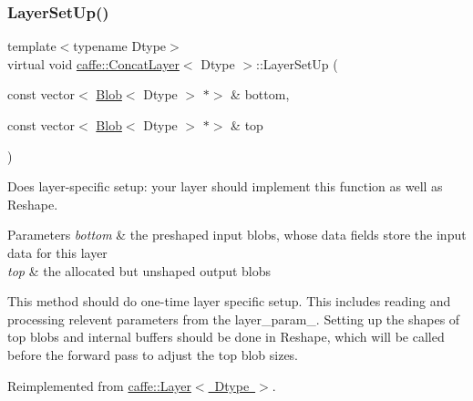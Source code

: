 \mbox{\label{classcaffe_1_1_concat_layer_aa39bdc6829d06c8cc501554ecd166513}} 
\subsubsection{\texorpdfstring{Layer\+Set\+Up()}{LayerSetUp()}\hspace{0.1cm}{\footnotesize\ttfamily [2/2]}}
{\footnotesize\ttfamily template$<$typename Dtype$>$ \\
virtual void \mbox{\hyperlink{classcaffe_1_1_concat_layer}{caffe\+::\+Concat\+Layer}}$<$ Dtype $>$\+::Layer\+Set\+Up (\begin{DoxyParamCaption}\item[{const vector$<$ \mbox{\hyperlink{classcaffe_1_1_blob}{Blob}}$<$ Dtype $>$ $\ast$$>$ \&}]{bottom,  }\item[{const vector$<$ \mbox{\hyperlink{classcaffe_1_1_blob}{Blob}}$<$ Dtype $>$ $\ast$$>$ \&}]{top }\end{DoxyParamCaption})\hspace{0.3cm}{\ttfamily [virtual]}}



Does layer-\/specific setup\+: your layer should implement this function as well as Reshape. 


\begin{DoxyParams}{Parameters}
{\em bottom} & the preshaped input blobs, whose data fields store the input data for this layer \\
\hline
{\em top} & the allocated but unshaped output blobs\\
\hline
\end{DoxyParams}
This method should do one-\/time layer specific setup. This includes reading and processing relevent parameters from the {\ttfamily layer\+\_\+param\+\_\+}. Setting up the shapes of top blobs and internal buffers should be done in {\ttfamily Reshape}, which will be called before the forward pass to adjust the top blob sizes. 

Reimplemented from \mbox{\hyperlink{classcaffe_1_1_layer_a481323a3e0972c682787f2137468c29f}{caffe\+::\+Layer$<$ Dtype $>$}}.

\mbox{\label{classcaffe_1_1_concat_layer_a314de9eb00a296ffd3cf84120bd1601e}} 
